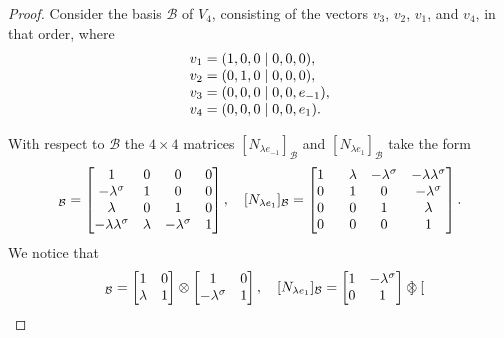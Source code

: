\begin{proof}
	Consider the basis $\mathcal{B}$ of $V_4$, consisting of the vectors $v_3$, $v_2$, $v_1$, and $v_4$, in that order, where
	\begin{equation*}
		\begin{array}{r@{\;}c@{\;}l}
			v_1 & = & (1,0,0\mid 0,0,0), \\
			v_2 & = & (0,1,0\mid 0,0,0), \\
			v_3 & = & (0,0,0\mid 0,0,e_{-1}), \\
			v_4 & = & (0,0,0\mid 0,0,e_1).
		\end{array}
	\end{equation*}
	
	With respect to $\mathcal{B}$ the $4 \times 4$ matrices
	$[N_{\lambda e_{-1}}]_{\mathcal{B}}$ and  $[N_{\lambda e_1}]_{\mathcal{B}}$ take the form
	\begin{equation*}
		[N_{\lambda e_{-1}}]_{\mathcal{B}}	= \begin{bmatrix}
			1 & 0 & 0 & 0 \\
			-\lambda^{\s} & 1 & 0 & 0 \\
			\lambda & 0 & 1 & 0 \\
			-\lambda\lambda^{\s} & \lambda & -\lambda^{\s} & 1
		\end{bmatrix},\quad 
		[N_{\lambda e_1}]_{\mathcal{B}} = \begin{bmatrix}
			1 & \phantom{-}\lambda & -\lambda^{\s} & -\lambda\lambda^{\s} \\
			0 & \phantom{-}1 & 0 & -\lambda^{\s} \\
			0 & \phantom{-}0 & 1 & \lambda \\
			0 & \phantom{-}0 & 0 & 1
		\end{bmatrix}.
	\end{equation*}
	We notice that 
	\begin{equation*}
		[N_{\lambda e_{-1}}]_{\mathcal{B}} = \begin{bmatrix}
			1 & 0 \\
			\lambda & 1 
		\end{bmatrix} \otimes
		\begin{bmatrix}
			1 & 0 \\
			-\lambda^{\s} & 1
		\end{bmatrix},\quad
		[N_{\lambda e_1}]_{\mathcal{B}} = \begin{bmatrix}
			1 & -\lambda^{\s} \\
			0 & 1
		\end{bmatrix} \otimes
		\begin{bmatrix}

\end{bmatrix}
\end{equation*}
\end{proof}

